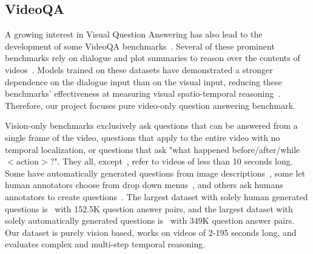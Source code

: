 \documentclass[10pt,twocolumn,letterpaper]{article}
\newcommand{\mgm}[1]{{\color{cyan}{mgm: #1}}}
\begin{document}
\subsection{VideoQA}

A growing interest in Visual Question Answering has also lead to the development of some VideoQA benchmarks~\cite{tapaswi2016movieqa,lei2018tvqa,jang2017tgif,kim2017deepstory,xu2017video,maharaj2017dataset,zeng2016leveraging,yu2019activitynet}. Several of these prominent benchmarks rely on dialogue and plot summaries to reason over the contents of videos~\cite{lei2018tvqa,tapaswi2016movieqa,kim2017deepstory}. Models trained on these datasets have demonstrated a stronger dependence on the dialogue input than on the visual input, reducing these benchmarks' effectiveness at measuring visual spatio-temporal reasoning~\cite{tapaswi2016movieqa,lei2018tvqa}. Therefore, our project focuses pure video-only question answering benchmark. 

Vision-only benchmarks exclusively ask questions that can be answered from a single frame of the video, questions that apply to the entire video with no temporal localization, or questions that ask "what happened before/after/while $<$action$>$?". They all, except~\cite{yu2019activitynet,xu2017video}, refer to videos of less than 10 seconds long.  Some have automatically generated questions from image descriptions~\cite{xu2017video,zeng2016leveraging}, some let human annotators choose from drop down menus~\cite{jang2017tgif}, and others ask humans annotators to create questions~\cite{yu2019activitynet,tapaswi2016movieqa,jang2017tgif,lei2018tvqa}. The largest dataset with solely human generated questions is~\cite{lei2018tvqa} with 152.5K question answer pairs, and the largest dataset with solely automatically generated questions is~\cite{maharaj2017dataset} with 349K question answer pairs. Our dataset is purely vision based, works on videos of 2-195 seconds long, and evaluates complex and multi-step temporal reasoning. \mgm{Very mch a laundry list of kist x y z. Maybe will do They are x, we are y. They are a, we are b structure? Otherwise take out less indteresting stuff}
\end{document}
